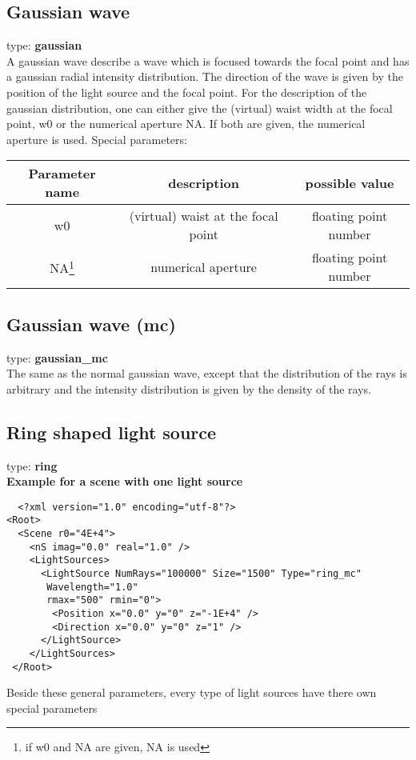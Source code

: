 \documentclass[a4paper,html,11pt,openany]{book}
\begin{document}
\subsection{Gaussian wave}
 type: \textbf{gaussian} \\
A gaussian wave describe a wave which is focused  towards the focal point and has a gaussian radial intensity distribution. The direction of the wave is given by the position of the light source and the focal point. For the description of the gaussian distribution, one can either give the (virtual) waist width at the focal point, w0 or the numerical aperture NA. If both are given, the numerical aperture is used. Special parameters:

\vspace{1em}
 \begin{tabular}{c|c|c}
 Parameter name & description  & possible value \\
 \hline
 w0 & (virtual) waist at the focal point & floating point number \\
 \hline
 NA\footnote{if w0 and NA are given, NA is used} & numerical aperture & floating point number \\ 
 \end{tabular}

\subsection{Gaussian wave (mc)} 
 type: \textbf{gaussian\_mc} \\
The same as the normal gaussian wave, except that the distribution of the rays is arbitrary and the intensity distribution is given by the density of the rays. 
\subsection{Ring shaped light source}
type: \textbf{ring} \\

\vspace{1em} 
 \textbf{Example for a scene with one light source}
 \lstset{language=XML}
 \begin{lstlisting}
  <?xml version="1.0" encoding="utf-8"?>
<Root>
  <Scene r0="4E+4">
    <nS imag="0.0" real="1.0" />
    <LightSources>
      <LightSource NumRays="100000" Size="1500" Type="ring_mc"
       Wavelength="1.0"
       rmax="500" rmin="0">
        <Position x="0.0" y="0" z="-1E+4" />
        <Direction x="0.0" y="0" z="1" />
      </LightSource>
    </LightSources>
 </Root>
 \end{lstlisting}
 Beside these general parameters, every type of light sources have there own special parameters

 
\end{document}
